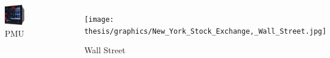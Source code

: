\documentclass[xcolor=table]{beamer}
\begin{document}
\begin{frame}
\begin{columns}
              \hspace{-50pt}
      \begin{figure}
        \includegraphics[scale=0.1]{thesis/graphics/pmu.png}
        \caption{PMU \cite{PMU}}
      \end{figure}
              \hspace{-100pt}
    \begin{figure}
        \texttt{[image: thesis/graphics/New\_York\_Stock\_Exchange,\_Wall\_Street.jpg]}
        \caption{Wall Street \cite{NEWYORK}}
      \end{figure}
  \end{columns}
\end{frame}
\end{document}
